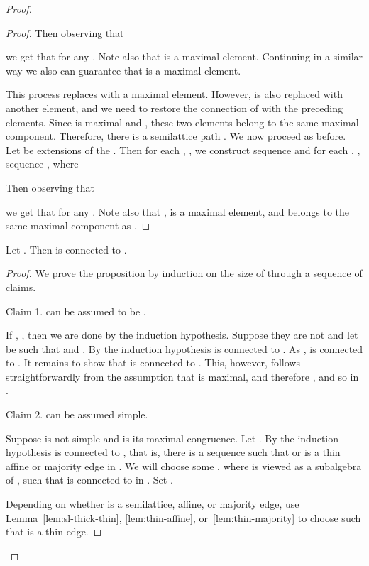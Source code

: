 \documentclass[11pt]{article}
\begin{document}
\begin{proof}
\begin{proof}
Then observing that

we get that  for
any . Note also that  is a maximal element.
Continuing in a similar way we also can guarantee that  is a
maximal element. 

This process replaces  with a maximal element. However,  is also
replaced with another element, and we need to restore the connection of  with 
the preceding elements. Since  is maximal and , these two 
elements belong to the same maximal component. Therefore, there is a semilattice path
. We now proceed as before. Let  be
extensions of the . Then for each , , we construct
sequence  and for each , ,
sequence , where 

Then observing that

we get that  for any
. Note also that ,  is a maximal
element, and  belongs to the same maximal component as .  
\end{proof}

\begin{prop}\label{pro:as-connectivity}
Let . Then  is connected to .
\end{prop}

\begin{proof}
We prove the proposition by induction on the size of  through a sequence of claims.

\smallskip

{\sc Claim 1.}
 can be assumed to be .

\smallskip

If , , then we are done by the induction hypothesis. 
Suppose they are not and let  be such that  and . 
By the induction hypothesis  is connected to . 
As ,  is connected to . It remains to show that 
 is connected to . This, however, follows straightforwardly from the assumption 
that  is maximal, and therefore , and so  in .

\smallskip

{\sc Claim 2.}
 can be assumed simple.

\smallskip

Suppose   is not simple and  is its maximal congruence. Let . By the 
induction hypothesis  is connected to , that is, there is a sequence  such that  or  is a 
thin affine or majority edge in . We will choose some , where  is 
viewed as a subalgebra of , such that  is connected to  in . 
Set .

Depending on whether  is a semilattice, affine, or majority edge, use 
Lemma~\ref{lem:sl-thick-thin}, \ref{lem:thin-affine}, or~\ref{lem:thin-majority} to
choose  such that  is a thin edge.



\end{proof}
\end{proof}
\end{document}
